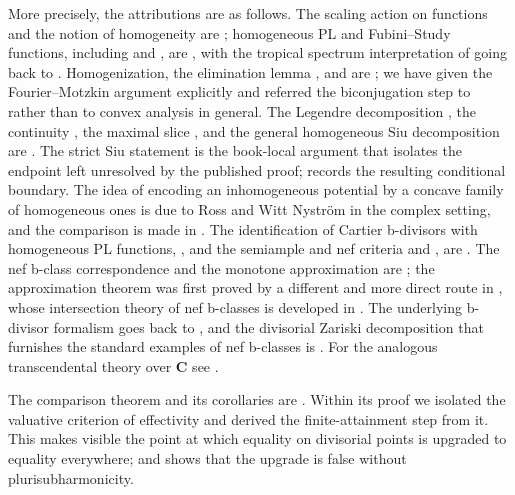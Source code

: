 More precisely, the attributions are as follows.  The scaling action on
functions and the notion of homogeneity are
\cite[\S1.1.4]{BJ22}; homogeneous PL and Fubini--Study functions, including
 and , are
\cite[\S6.1]{BJ22}, with the tropical spectrum interpretation of
 going back to
\cite{JM12}.  Homogenization, the elimination lemma
, and  are
\cite[\S6.2]{BJ22}; we have given the Fourier--Motzkin argument explicitly
and referred the biconjugation step to
 rather than to convex analysis in general.
The Legendre decomposition
, the continuity
, the maximal slice
, and the general homogeneous Siu decomposition
 are
\cite[\S6.3, Theorem~6.21]{BJ22}.  The strict Siu statement
 is the book-local argument that isolates the
endpoint left unresolved by the published proof;
 records the resulting conditional boundary.  The idea of encoding an
inhomogeneous potential by a concave family of homogeneous ones is due to
Ross and Witt Nystr\"om \cite{RWN14} in the complex setting, and the
comparison is made in .  The identification of
Cartier b-divisors with homogeneous PL functions,
, and the semiample and nef criteria
 and
, are \cite[\S6.4]{BJ22}.  The nef
b-class correspondence  and the
monotone approximation  are
\cite[\S6.5]{BJ22}; the approximation theorem was first proved by a
different and more direct route in \cite{DF20}, whose intersection theory of
nef b-classes is developed in .  The
underlying b-divisor formalism goes back to \cite{BFJ09}, and the
divisorial Zariski decomposition that furnishes the standard examples of nef
b-classes is \cite{Bou04,Nak04}.  For the analogous transcendental theory
over $\mathbf C$ see \cite{Xiabdiv,Xiabdiv2}.

The comparison theorem  and its
corollaries are \cite[Theorem~4.22 and Corollary~4.23]{BJ22}.  Within its
proof we isolated the valuative criterion of effectivity
 and derived the finite-attainment step from it.
This makes visible the point at which equality on divisorial points is
upgraded to equality everywhere; and
 shows that the upgrade is false without
plurisubharmonicity.

